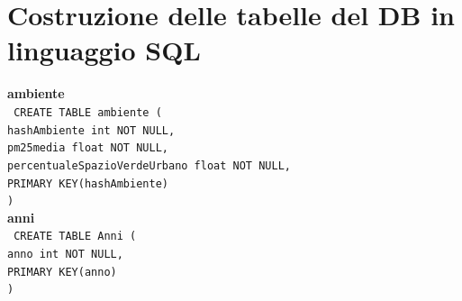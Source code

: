 \documentclass[a4paper,12pt]{report}
\begin{document}
            \section{Costruzione delle tabelle del DB in linguaggio SQL}
                
                \noindent
                {\large \textbf{ambiente}} \\
                \texttt{
                    CREATE TABLE ambiente ( \\
                    \null\quad\quad hashAmbiente int NOT NULL, \\
                    \null\quad\quad pm25media                      float           NOT NULL, \\
                    \null\quad\quad percentualeSpazioVerdeUrbano    float           NOT NULL, \\
                    \null\quad\quad PRIMARY KEY(hashAmbiente) \\
                    )
                } \\

                \noindent
                {\large \textbf{anni}} \\
                \texttt{
                    CREATE TABLE Anni ( \\
                    \null\quad\quad anno    int     NOT NULL, \\
                    \null\quad\quad PRIMARY KEY(anno) \\
                    )
                } \\
\end{document}
